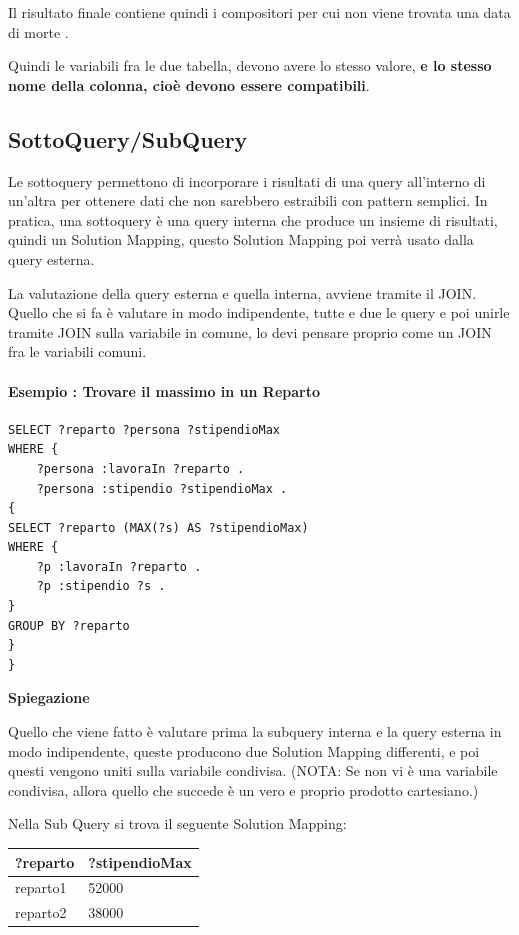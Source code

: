Il risultato finale contiene quindi i compositori per cui non viene trovata una data di morte .

\begin{center}
    Quindi le variabili fra le due tabella, devono avere lo stesso valore, \textbf{e lo stesso nome della colonna, cioè devono essere compatibili}.
\end{center}

\subsection{SottoQuery/SubQuery}
Le sottoquery permettono di incorporare i risultati di una query all'interno di un'altra per
ottenere dati che non sarebbero estraibili con pattern semplici.
In pratica, una sottoquery è una query interna che produce un insieme di risultati, quindi un
Solution Mapping, questo Solution Mapping poi verrà usato dalla query esterna.

\begin{center}
La valutazione della query esterna e quella interna, avviene tramite il JOIN.
Quello che si fa è valutare in modo indipendente, tutte e due le query e poi unirle tramite
JOIN sulla variabile in comune, lo devi pensare proprio come un JOIN fra le variabili
comuni.
\end{center}

\paragraph{Esempio : Trovare il massimo in un Reparto}


\begin{lstlisting}
SELECT ?reparto ?persona ?stipendioMax
WHERE {
    ?persona :lavoraIn ?reparto .
    ?persona :stipendio ?stipendioMax .
{
SELECT ?reparto (MAX(?s) AS ?stipendioMax)
WHERE {
    ?p :lavoraIn ?reparto .
    ?p :stipendio ?s .
}
GROUP BY ?reparto
}
}
\end{lstlisting}


\textbf{Spiegazione} 

Quello che viene fatto è valutare prima la subquery interna e la query esterna in modo indipendente, queste producono due Solution Mapping differenti, e poi questi vengono uniti sulla variabile condivisa. (NOTA: Se non vi è una variabile condivisa, allora quello che succede è un vero e proprio prodotto cartesiano.) 

Nella Sub Query si trova il seguente Solution Mapping: 

\begin{table}[h!]
\centering
\begin{tabular}{|l|l|}
\hline
\textbf{?reparto} & \textbf{?stipendioMax} \\ \hline
reparto1 & 52000 \\ \hline
reparto2 & 38000 \\ \hline
\end{tabular}
\end{table} 

